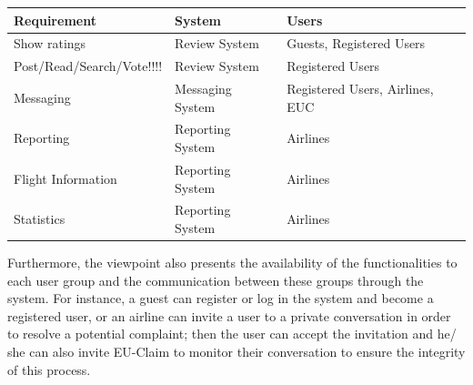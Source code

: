 \begin{longtable}{| l | l | l |}
\label{tab:associateSysReq}
\textbf{Requirement} & \textbf{System} & \textbf{Users} \\ \hline
Show ratings & Review System & Guests, Registered Users  \\ \hline
Post/Read/Search/Vote!!!! & Review System & Registered Users \\ \hline
Messaging & Messaging System & Registered Users, Airlines, EUC\\ \hline
Reporting  & Reporting System & Airlines \\ \hline
Flight Information & Reporting System & Airlines  \\ \hline
Statistics & Reporting System & Airlines \\ \hline 

\end{longtable}

 Furthermore, the viewpoint also presents the availability of the functionalities to each user group and the communication between these groups through the system. For instance, a guest can register or log in the system and  become a registered user, or an airline can invite a user to a private conversation in order to resolve a potential complaint; then the user can accept the invitation and he/ she can 
 also invite EU-Claim to monitor their conversation to ensure the integrity of this process.

